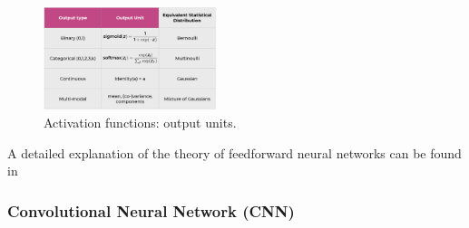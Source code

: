\documentclass[letter,8pt]{article}\usepackage[]{graphicx}\usepackage[]{color}
\begin{document}
\begin{figure}
  \begin{center}
    \includegraphics[width=0.45\textwidth]{figure/activation_function_output.png}
      \end{center}
     \caption{Activation functions: output units. \cite[slide 24]{nnheca2019}}
     \label{fig:activation}
\end{figure}

A detailed explanation of the theory of feedforward neural networks can be found in \cite[Chapter 6]{Goodfellow-et-al-2016}


\subsubsection{Convolutional Neural Network (CNN)}
\end{document}
